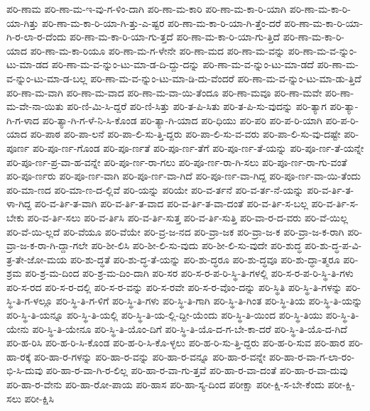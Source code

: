 {ಪರಿ-ಣಾಮ
ಪರಿ-ಣಾ-ಮ-ಇ-ವು-ಗ-ಳಿಂ-ದಾಗಿ
ಪರಿ-ಣಾ-ಮ-ಕಾರಿ
ಪರಿ-ಣಾ-ಮ-ಕಾ-ರಿ-ಯಾಗಿ
ಪರಿ-ಣಾ-ಮ-ಕಾ-ರಿ-ಯಾ-ಗಿತ್ತು
ಪರಿ-ಣಾ-ಮ-ಕಾ-ರಿ-ಯಾ-ಗಿ-ತ್ತು-ಎ-ಷ್ಟರ
ಪರಿ-ಣಾ-ಮ-ಕಾ-ರಿ-ಯಾ-ಗಿ-ತ್ತೆಂ-ದರೆ
ಪರಿ-ಣಾ-ಮ-ಕಾ-ರಿ-ಯಾ-ಗಿ-ರ-ಲಾ-ರ-ದೆಂದು
ಪರಿ-ಣಾ-ಮ-ಕಾ-ರಿ-ಯಾ-ಗು-ತ್ತದೆ
ಪರಿ-ಣಾ-ಮ-ಕಾ-ರಿ-ಯಾ-ಗು-ತ್ತಿದೆ
ಪರಿ-ಣಾ-ಮ-ಕಾ-ರಿ-ಯಾದ
ಪರಿ-ಣಾ-ಮ-ಕಾ-ರಿಯೂ
ಪರಿ-ಣಾ-ಮ-ಗ-ಳೇನೇ
ಪರಿ-ಣಾ-ಮದ
ಪರಿ-ಣಾ-ಮ-ವನ್ನು
ಪರಿ-ಣಾ-ಮ-ವ-ನ್ನುಂ-ಟು-ಮಾ-ಡದ
ಪರಿ-ಣಾ-ಮ-ವ-ನ್ನುಂ-ಟು-ಮಾ-ಡ-ದಿ-ದ್ದು-ದನ್ನು
ಪರಿ-ಣಾ-ಮ-ವ-ನ್ನುಂ-ಟು-ಮಾ-ಡದೆ
ಪರಿ-ಣಾ-ಮ-ವ-ನ್ನುಂ-ಟು-ಮಾ-ಡ-ಬಲ್ಲ
ಪರಿ-ಣಾ-ಮ-ವ-ನ್ನುಂ-ಟು-ಮಾ-ಡಿ-ದು-ವೆಂದರೆ
ಪರಿ-ಣಾ-ಮ-ವ-ನ್ನುಂ-ಟು-ಮಾ-ಡು-ತ್ತಿದೆ
ಪರಿ-ಣಾ-ಮ-ವಾಗಿ
ಪರಿ-ಣಾ-ಮ-ವಾದ
ಪರಿ-ಣಾ-ಮ-ವಾ-ಯಿ-ತೆಂದೂ
ಪರಿ-ಣಾ-ಮವೂ
ಪರಿ-ಣಾ-ಮವೇ
ಪರಿ-ಣಾ-ಮ-ವೇ-ನಾ-ಯಿತು
ಪರಿ-ಣಿ-ಮಿ-ಸಿ-ದ್ದರೆ
ಪರಿ-ಣಿ-ಸಿತ್ತು
ಪರಿ-ತ-ಪಿ-ಸಿತು
ಪರಿ-ತ-ಪಿ-ಸು-ವುದನ್ನು
ಪರಿ-ತ್ಯಾಗ
ಪರಿ-ತ್ಯಾ-ಗಿ-ಗ-ಳಾದ
ಪರಿ-ತ್ಯಾ-ಗಿ-ಗ-ಳೆ-ನಿ-ಸಿ-ಕೊಂಡ
ಪರಿ-ತ್ಯಾ-ಗಿ-ಯಾದ
ಪರಿ-ಧಿಯು
ಪರಿ-ಪರಿ
ಪರಿ-ಪ-ರಿ-ಯಾಗಿ
ಪರಿ-ಪ-ರಿ-ಯಾದ
ಪರಿ-ಪಾಠ
ಪರಿ-ಪಾ-ಲನೆ
ಪರಿ-ಪಾ-ಲಿ-ಸು-ತ್ತಿ-ದ್ದರು
ಪರಿ-ಪಾ-ಲಿ-ಸು-ವ-ವರು
ಪರಿ-ಪಾ-ಲಿ-ಸು-ವು-ದಷ್ಟೇ
ಪರಿ-ಪೂರ್ಣ
ಪರಿ-ಪೂ-ರ್ಣ-ಗೊಂಡ
ಪರಿ-ಪೂ-ರ್ಣತೆ
ಪರಿ-ಪೂ-ರ್ಣ-ತೆಗೆ
ಪರಿ-ಪೂ-ರ್ಣ-ತೆ-ಯನ್ನು
ಪರಿ-ಪೂ-ರ್ಣ-ತೆ-ಯನ್ನೇ
ಪರಿ-ಪೂ-ರ್ಣ-ಪ್ರ-ವಾ-ಹ-ವನ್ನೇ
ಪರಿ-ಪೂ-ರ್ಣ-ರಾ-ಗಲು
ಪರಿ-ಪೂ-ರ್ಣ-ರಾ-ಗಿ-ಸಲು
ಪರಿ-ಪೂ-ರ್ಣ-ರಾ-ಗು-ವಂತೆ
ಪರಿ-ಪೂ-ರ್ಣರು
ಪರಿ-ಪೂ-ರ್ಣ-ವಾಗಿ
ಪರಿ-ಪೂ-ರ್ಣ-ವಾ-ಗಿದೆ
ಪರಿ-ಪೂ-ರ್ಣ-ವಾ-ಗಿದ್ದ
ಪರಿ-ಪೂ-ರ್ಣ-ವಾ-ಯಿ-ತೆಂದು
ಪರಿ-ಮಾ-ಣದ
ಪರಿ-ಮಾ-ಣ-ದ-ಲ್ಲಿವೆ
ಪರಿ-ಯನ್ನು
ಪರಿಯೇ
ಪರಿ-ವ-ರ್ತನೆ
ಪರಿ-ವ-ರ್ತ-ನೆ-ಯನ್ನು
ಪರಿ-ವ-ರ್ತಿ-ತ-ಳಾ-ಗಿದ್ದ
ಪರಿ-ವ-ರ್ತಿ-ತ-ವಾಗಿ
ಪರಿ-ವ-ರ್ತಿ-ತ-ವಾದ
ಪರಿ-ವ-ರ್ತಿ-ತ-ವಾ-ದಂತೆ
ಪರಿ-ವ-ರ್ತಿ-ಸ-ಬಲ್ಲ
ಪರಿ-ವ-ರ್ತಿ-ಸ-ಬೇಕು
ಪರಿ-ವ-ರ್ತಿ-ಸಲು
ಪರಿ-ವ-ರ್ತಿಸಿ
ಪರಿ-ವ-ರ್ತಿ-ಸುತ್ತ
ಪರಿ-ವ-ರ್ತಿ-ಸುತ್ತಿ
ಪರಿ-ವಾ-ರ-ದ-ವರು
ಪರಿ-ವೆ-ಯಿಲ್ಲ
ಪರಿ-ವೆ-ಯಿ-ಲ್ಲದೆ
ಪರಿ-ವೆಯೂ
ಪರಿ-ವೆಯೇ
ಪರಿ-ವ್ರ-ಜ-ನದ
ಪರಿ-ವ್ರಾ-ಜಕ
ಪರಿ-ವ್ರಾ-ಜ-ಕ
ಪರಿ-ವ್ರಾ-ಜ-ಕ-ರಾಗಿ
ಪರಿ-ವ್ರಾ-ಜ-ಕ-ರಾ-ಗಿ-ದ್ದಾ-ಗಲೇ
ಪರಿ-ಶೀ-ಲಿಸಿ
ಪರಿ-ಶೀ-ಲಿ-ಸು-ವುದು
ಪರಿ-ಶೀ-ಲಿ-ಸು-ವುದೇ
ಪರಿ-ಶುದ್ಧ
ಪರಿ-ಶು-ದ್ಧ-ಪ-ವಿ-ತ್ರ-ತೇ-ಜೋ-ಮಯ
ಪರಿ-ಶು-ದ್ಧತೆ
ಪರಿ-ಶು-ದ್ಧ-ತೆ-ಯನ್ನು
ಪರಿ-ಶು-ದ್ಧರೂ
ಪರಿ-ಶು-ದ್ಧವೂ
ಪರಿ-ಶು-ದ್ಧಾ-ತ್ಮರೂ
ಪರಿ-ಶ್ರಮ
ಪರಿ-ಶ್ರ-ಮ-ದಿಂದ
ಪರಿ-ಶ್ರ-ಮ-ದಿಂ-ದಾಗಿ
ಪರಿ-ಸರ
ಪರಿ-ಸ-ರ-ಪ-ರಿ-ಸ್ಥಿ-ತಿ-ಗಳಲ್ಲಿ
ಪರಿ-ಸ-ರ-ಪ-ರಿ-ಸ್ಥಿ-ತಿ-ಗಳು
ಪರಿ-ಸ-ರದ
ಪರಿ-ಸ-ರ-ದಲ್ಲಿ
ಪರಿ-ಸ-ರ-ವನ್ನು
ಪರಿ-ಸ-ರವೇ
ಪರಿ-ಸ-ರ-ವೊಂ-ದನ್ನು
ಪರಿ-ಸ್ಥಿತಿ
ಪರಿ-ಸ್ಥಿ-ತಿ-ಗಳನ್ನು
ಪರಿ-ಸ್ಥಿ-ತಿ-ಗ-ಳಲ್ಲೂ
ಪರಿ-ಸ್ಥಿ-ತಿ-ಗ-ಳಿಗೆ
ಪರಿ-ಸ್ಥಿ-ತಿ-ಗಳು
ಪರಿ-ಸ್ಥಿ-ತಿ-ಗಾಗಿ
ಪರಿ-ಸ್ಥಿ-ತಿ-ಗಿಂತ
ಪರಿ-ಸ್ಥಿ-ತಿಯ
ಪರಿ-ಸ್ಥಿ-ತಿ-ಯನ್ನು
ಪರಿ-ಸ್ಥಿ-ತಿ-ಯನ್ನೂ
ಪರಿ-ಸ್ಥಿ-ತಿ-ಯಲ್ಲಿ
ಪರಿ-ಸ್ಥಿ-ತಿ-ಯ-ಲ್ಲಿ-ದ್ದೀ-ಯೆಂದು
ಪರಿ-ಸ್ಥಿ-ತಿ-ಯಿಂದ
ಪರಿ-ಸ್ಥಿ-ತಿಯು
ಪರಿ-ಸ್ಥಿ-ತಿ-ಯೇನು
ಪರಿ-ಸ್ಥಿ-ತಿ-ಯೇನೂ
ಪರಿ-ಸ್ಥಿ-ತಿ-ಯೊಂ-ದಿಗೆ
ಪರಿ-ಸ್ಥಿ-ತಿ-ಯೊ-ದ-ಗ-ಬೇ-ಕಾ-ದರೆ
ಪರಿ-ಸ್ಥಿ-ತಿ-ಯೊ-ದ-ಗಿದೆ
ಪರಿ-ಹ-ರಿಸಿ
ಪರಿ-ಹ-ರಿ-ಸಿ-ಕೊಂಡ
ಪರಿ-ಹ-ರಿ-ಸಿ-ಕೊ-ಳ್ಳಲು
ಪರಿ-ಹ-ರಿ-ಸು-ತ್ತಿ-ದ್ದರು
ಪರಿ-ಹ-ರಿ-ಸುವ
ಪರಿ-ಹಾರ
ಪರಿ-ಹಾ-ರಕ್ಕೆ
ಪರಿ-ಹಾ-ರ-ಗಳನ್ನು
ಪರಿ-ಹಾ-ರ-ವನ್ನು
ಪರಿ-ಹಾ-ರ-ವನ್ನೂ
ಪರಿ-ಹಾ-ರ-ವನ್ನೇ
ಪರಿ-ಹಾ-ರ-ವಾ-ಗ-ಲಾ-ರಂ-ಭಿ-ಸಿ-ದುವು
ಪರಿ-ಹಾ-ರ-ವಾ-ಗಿ-ರ-ಲಿಲ್ಲ
ಪರಿ-ಹಾ-ರ-ವಾ-ಗು-ತ್ತವೆ
ಪರಿ-ಹಾ-ರ-ವಾ-ದಂತೆ
ಪರಿ-ಹಾ-ರ-ವಾ-ದುವು
ಪರಿ-ಹಾ-ರ-ವೇನು
ಪರಿ-ಹಾ-ರೋ-ಪಾಯ
ಪರಿ-ಹಾಸ
ಪರಿ-ಹಾ-ಸ್ಯ-ದಿಂದ
ಪರೀಕ್ಷಾ
ಪರೀ-ಕ್ಷಿ-ಸ-ಬೇ-ಕೆಂದು
ಪರೀ-ಕ್ಷಿ-ಸಲು
ಪರೀ-ಕ್ಷಿಸಿ
}
